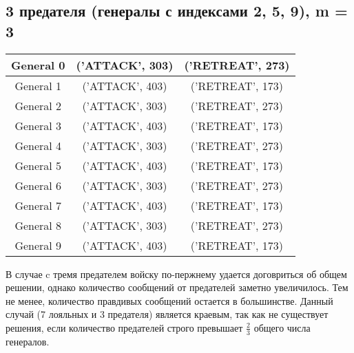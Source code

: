 \documentclass[12pt,a4paper]{article}
\begin{document}
            \subsection{3 предателя (генералы с индексами 2, 5, 9), m = 3}
                \begin{center}
                    \begin{tabular}{|c|c|c|}
                        \hline
                        General 0 & ('ATTACK', 303) & ('RETREAT', 273) \\ \hline
                        General 1 & ('ATTACK', 403) & ('RETREAT', 173) \\ \hline
                        General 2 & ('ATTACK', 303) & ('RETREAT', 273) \\ \hline
                        General 3 & ('ATTACK', 403) & ('RETREAT', 173) \\ \hline
                        General 4 & ('ATTACK', 303) & ('RETREAT', 273) \\ \hline
                        General 5 & ('ATTACK', 403) & ('RETREAT', 173) \\ \hline
                        General 6 & ('ATTACK', 303) & ('RETREAT', 273) \\ \hline
                        General 7 & ('ATTACK', 403) & ('RETREAT', 173) \\ \hline
                        General 8 & ('ATTACK', 303) & ('RETREAT', 273) \\ \hline
                        General 9 & ('ATTACK', 403) & ('RETREAT', 173) \\ \hline
                    \end{tabular}
            \end{center}
            В случае c тремя предателем войску по-пержнему удается договриться об общем решении, однако количество сообщений от предателей заметно увеличилось. Тем не менее, количество правдивых сообщений остается в большинстве. Данный случай (7 лояльных и 3 предателя) является краевым, так как не существует решения, если количество предателей строго превышает $\frac{2}{3}$ общего числа генералов.
\end{document}
